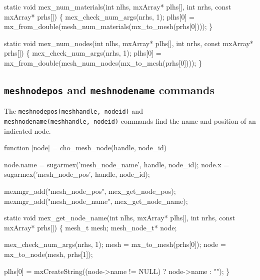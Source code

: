 static void mex_num_materials(int nlhs, mxArray* plhs[],
                              int nrhs, const mxArray* prhs[])
\{
    mex_check_num_args(nrhs, 1);
    plhs[0] = mx_from_double(mesh_num_materials(mx_to_mesh(prhs[0])));
\}

static void mex_num_nodes(int nlhs, mxArray* plhs[],
                          int nrhs, const mxArray* prhs[])
\{
    mex_check_num_args(nrhs, 1);
    plhs[0] = mx_from_double(mesh_num_nodes(mx_to_mesh(prhs[0])));
\}

\nwendcode{}\nwdocspar


\subsection{{\tt{}mesh{}node{}pos} and {\tt{}mesh{}node{}name} commands}

The {\tt{}mesh{}node{}pos(mesh{}handle,\ node{}id)} and 
{\tt{}mesh{}node{}name(mesh{}handle,\ node{}id)} commands find the name
and position of an indicated node.

\nwenddocs{}\endmoddef
function [node] = cho_mesh_node(handle, node_id)

node.name = sugarmex('mesh_node_name', handle, node_id);
node.x    = sugarmex('mesh_node_pos',  handle, node_id);
\nwendcode{}\nwdocspar

\nwenddocs{}\plusendmoddef
mexmgr_add("mesh_node_pos", mex_get_node_pos);
mexmgr_add("mesh_node_name", mex_get_node_name);
\nwendcode{}\nwdocspar

\nwenddocs{}\plusendmoddef
static void mex_get_node_name(int nlhs, mxArray* plhs[],
                              int nrhs, const mxArray* prhs[])
\{
    mesh_t       mesh;
    mesh_node_t* node;

    mex_check_num_args(nrhs, 1);
    mesh = mx_to_mesh(prhs[0]);
    node = mx_to_node(mesh, prhs[1]);

    plhs[0] = mxCreateString((node->name != NULL) ? node->name : "");
\}

